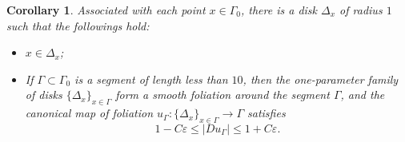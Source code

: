 \documentclass[a4paper, reqno]{amsart}
\newtheorem{corollary}[theorem]{Corollary}
\theoremstyle{definition}
\theoremstyle{remark}
\numberwithin{equation}{section}
\numberwithin{equation}{section}
\numberwithin{equation}{section}
\begin{document}
\bigskip

\begin{corollary}{\label{local foliation}}
Associated with each point $x\in \Gamma_0$, there is a disk $\Delta_x$ of radius $1$	such that the followings hold:
\begin{itemize}
\item[(i)] $x\in\Delta_x$;
\item[(ii)] If $\Gamma\subset\Gamma_0$ is a segment of length less than $10$, then the one-parameter family of disks $\{\Delta_x\}_{x\in\Gamma}$ form a smooth foliation around the segment $\Gamma$, and the canonical map of foliation $u_{\Gamma}: \{\Delta_x\}_{x\in\Gamma}\to \Gamma$ satisfies
	\[ 1 - C\varepsilon \leq |Du_{\Gamma}| \leq 1 + C\varepsilon.\] 	
\end{itemize}
\end{corollary}
\end{document}
